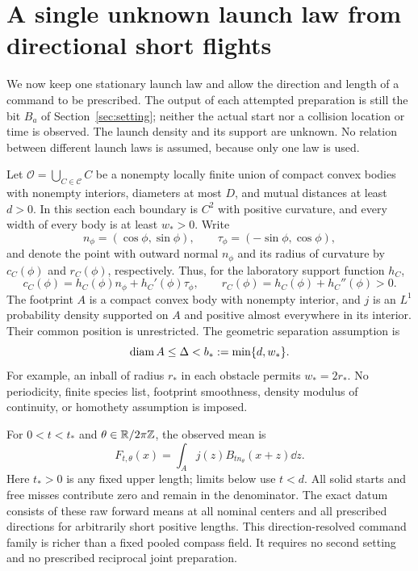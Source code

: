 \section{A single unknown launch law from directional short flights}
\label{sec:single-law-rigidity}
We now keep one stationary launch law and allow the direction and
length of a command to be prescribed.  The output of each attempted
preparation is still the bit $B_a$ of Section~\ref{sec:setting}; neither
the actual start nor a collision location or time is observed.  The
launch density and its support are unknown.  No relation between
different launch laws is assumed, because only one law is used.

Let $\mathcal O=\bigcup_{C\in\mathcal C}C$ be a nonempty locally
finite union of compact convex bodies with nonempty interiors,
diameters at most $D$, and mutual distances at least $d>0$.
In this section each boundary is $C^2$ with positive curvature, and
every width of every body is at least $w_*>0$.  Write
\[
 n_\phi=(\cos\phi,\sin\phi),\qquad
 \tau_\phi=(-\sin\phi,\cos\phi),
\]
and denote the point with outward normal $n_\phi$ and its radius of
curvature by $c_C(\phi)$ and $r_C(\phi)$, respectively.  Thus, for the
laboratory support function $h_C$,
\begin{equation}\label{eq:single-gauss-parametrization}
 c_C(\phi)=h_C(\phi)n_\phi+h_C'(\phi)\tau_\phi,
 \qquad r_C(\phi)=h_C(\phi)+h_C''(\phi)>0.
\end{equation}
The footprint $A$ is a compact convex body with nonempty interior,
and $j$ is an $L^1$ probability density supported on $A$ and positive
almost everywhere in its interior.  Their common position is
unrestricted.  The geometric separation assumption is
\begin{equation}\label{eq:single-footprint-separation}
 \operatorname{diam} A\le\Delta< b_*:=\min\{d,w_*\}.
\end{equation}
For example, an inball of radius $r_*$ in each obstacle permits
$w_*=2r_*$.  No periodicity, finite species list, footprint smoothness,
density modulus of continuity, or homothety assumption is imposed.

For $0<t<t_*$ and $\theta\in\mathbb R/2\pi\mathbb Z$, the observed mean is
\begin{equation}\label{eq:single-raw-response}
 F_{t,\theta}(x)=\int_A j(z)B_{t n_\theta}(x+z)\dd z.
\end{equation}
Here $t_*>0$ is any fixed upper length; limits below use $t<d$.
All solid starts and free misses contribute zero and remain in the
denominator.  The exact datum consists of these raw forward means at
all nominal centers and all prescribed directions for arbitrarily
short positive lengths.  This direction-resolved command family is
richer than a fixed pooled compass field.  It requires no second
setting and no prescribed reciprocal joint preparation.

